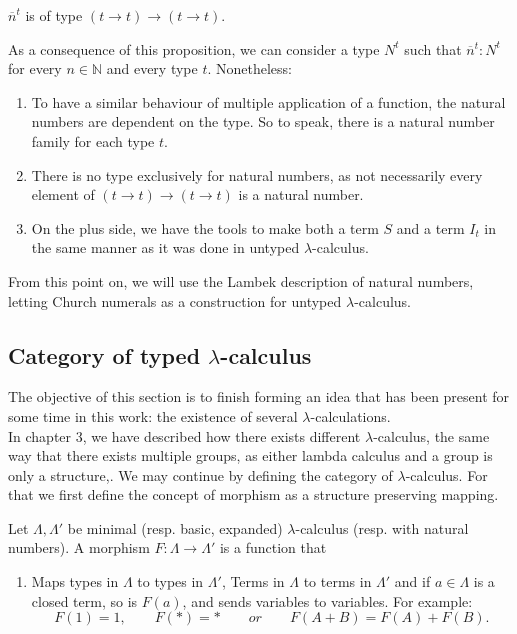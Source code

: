 \begin{definition}
\begin{definition}
\end{definition}

\begin{remark}
  $\overline n^t$ is of type $(t\to t)\to(t\to t)$.
\end{remark}

As a consequence of this proposition, we can consider a type $N^t$ such that $\overline n^t:N^t$ for every $n\in\mathbb{N}$ and every type $t$. Nonetheless:
\begin{enumerate}

\item To have a similar behaviour of multiple application of a function, the natural numbers are dependent on the type. So to speak, there is a natural number family for each type $t$.
\item There is no type exclusively for natural numbers, as not necessarily every element of $(t\to t)\to(t\to t)$ is a natural number.
\item On the plus side, we have the tools to make both a term $S$ and a term $I_t$ in the same manner as it was done in untyped $\lambda$-calculus. \\
\end{enumerate}
From this point on, we will use the Lambek description of natural numbers, letting Church numerals as a construction for untyped $\lambda$-calculus.\\


\subsection{Category of typed $\lambda$-calculus}

The objective of this section is to finish forming an idea that has been present for some time in this work: the existence of several $\lambda$-calculations. \\

In chapter 3, we have described how there exists different $\lambda$-calculus, the same way that there exists multiple groups, as either lambda calculus and a group is only a structure,. We may continue by defining the category of $\lambda$-calculus. For that we first define the concept of morphism as a structure preserving mapping.



\begin{definition}
  Let $\Lambda, \Lambda '$ be minimal (resp. basic, expanded) $\lambda$-calculus (resp. with natural numbers). A morphism $F: \Lambda \to \Lambda '$ is a function that
  \begin{enumerate}
  \item Maps types in $\Lambda$ to types in $\Lambda '$, Terms in $\Lambda$ to terms in $\Lambda '$ and if $a\in \Lambda$ is a closed term, so is $F(a)$, and sends variables to variables. For example: $$F(1) = 1, \qquad F(*) = * \qquad or \qquad F(A+B) =F(A)+F(B).$$
    

\end{enumerate}
\end{definition}
\end{definition}
